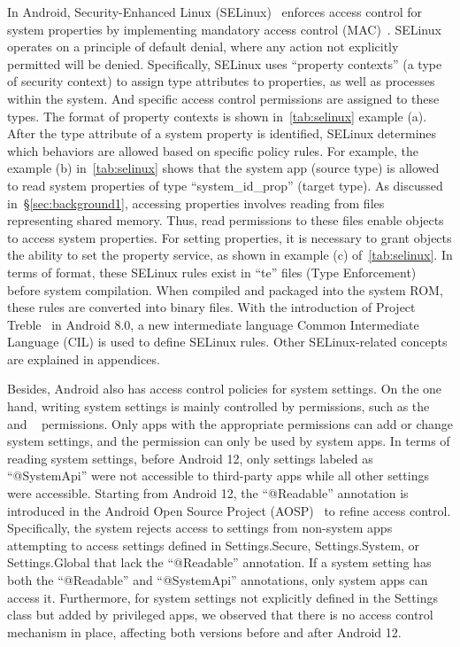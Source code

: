 In Android, Security-Enhanced Linux (SELinux)~\cite{selinux} enforces access control for system properties by implementing mandatory access control (MAC)~\cite{mac}.
SELinux operates on a principle of default denial, where any action not explicitly permitted will be denied.
Specifically, SELinux uses ``property contexts'' (a type of security context) to assign type attributes to properties, as well as processes within the system.
And specific access control permissions are assigned to these types.
The format of property contexts is shown in~\autoref{tab:selinux} example (a).
After the type attribute of a system property is identified, SELinux determines which behaviors are allowed based on specific policy rules.
For example, the example (b) in~\autoref{tab:selinux} shows that the system app (source type) is allowed to read system properties of type “system\_id\_prop” (target type).
As discussed in~\S\ref{sec:background1}, accessing properties involves reading from files representing shared memory. 
Thus, read permissions to these files enable objects to access system properties.
For setting properties, it is necessary to grant objects the ability to set the property service, as shown in example (c) of~\autoref{tab:selinux}.
In terms of format, these SELinux rules exist in ``te'' files (Type Enforcement) before system compilation. 
When compiled and packaged into the system ROM, these rules are converted into binary files. 
With the introduction of Project Treble~\cite{treble} in Android 8.0, a new intermediate language Common Intermediate Language (CIL) is used to define SELinux rules.
Other SELinux-related concepts are explained in appendices.

Besides, Android also has access control policies for system settings.
On the one hand, writing system settings is mainly controlled by permissions, such as the \texttt{}~\cite{write_settings} and \texttt{}~\cite{write_secure_settings} permissions.
Only apps with the appropriate permissions can add or change system settings, and the \texttt{} permission can only be used by system apps.
In terms of reading system settings, before Android 12, only settings labeled as ``@SystemApi'' were not accessible to third-party apps while all other settings were accessible.
Starting from Android 12, the ``@Readable'' annotation is introduced in the Android Open Source Project (AOSP)~\cite{aosp} to refine access control.
Specifically, the system rejects access to settings from non-system apps attempting to access settings defined in Settings.Secure, Settings.System, or Settings.Global that lack the ``@Readable'' annotation.
If a system setting has both the ``@Readable'' and ``@SystemApi'' annotations, only system apps can access it.
Furthermore, for system settings not explicitly defined in the Settings class but added by privileged apps, we observed that there is no access control mechanism in place, affecting both versions before and after Android 12.